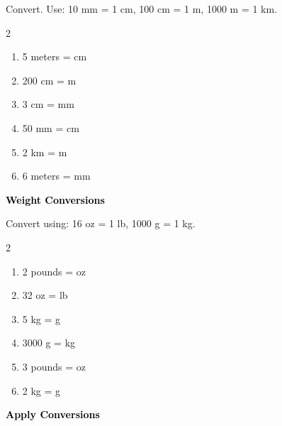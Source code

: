 \documentclass[12pt, letterpaper, fleqn]{article}
\newcommand{\blank}{\underline{\hspace{2.2cm}}}
\begin{document}
\noindent
Convert. Use: 10 mm = 1 cm, 100 cm = 1 m, 1000 m = 1 km.

\vspace{3mm}

\begin{multicols}{2}
\begin{enumerate}[itemsep=1.3cm, leftmargin=0.6cm]
\item 5 meters = \blank \; cm
\item 200 cm = \blank \; m
\item 3 cm = \blank \; mm
\item 50 mm = \blank \; cm
\item 2 km = \blank \; m
\item 6 meters = \blank \; mm
\end{enumerate}
\end{multicols}

\newpage

\begin{tcolorbox}[colback=customteal!20]
\large\textcolor{black}{\textbf{Weight Conversions}}
\end{tcolorbox}

\noindent
Convert using: 16 oz = 1 lb, 1000 g = 1 kg.

\vspace{3mm}

\begin{multicols}{2}
\begin{enumerate}[itemsep=1.3cm, leftmargin=0.6cm]
\item 2 pounds = \blank \; oz
\item 32 oz = \blank \; lb
\item 5 kg = \blank \; g
\item 3000 g = \blank \; kg
\item 3 pounds = \blank \; oz
\item 2 kg = \blank \; g
\end{enumerate}
\end{multicols}

\newpage

\begin{tcolorbox}[colback=customteal!20]
\large\textcolor{black}{\textbf{Apply Conversions}}
\end{tcolorbox}
\end{document}
